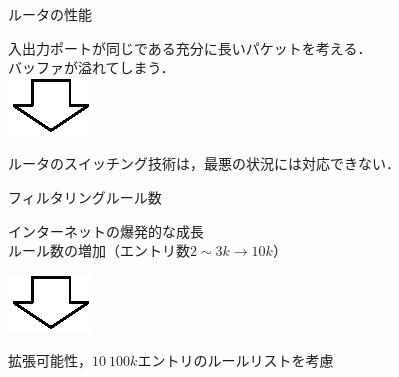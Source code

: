 \documentclass[12pt,dvipdfmx,mathserif,uplatex,aspectratio=32]{beamer}
\begin{document}
\begin{frame}{ルータの性能}

入出力ポートが同じである充分に長いパケットを考える．\\
\vspace{3mm}
 \hspace{1mm} バッファが溢れてしまう．\\

\vspace{5mm}
{\centering
\includegraphics{downarrow.eps} \\

}
\vspace{5mm}

{\centering
ルータのスイッチング技術は，最悪の状況には対応できない．

}

\end{frame}


\begin{frame}{フィルタリングルール数}

インターネットの爆発的な成長 \\ \vspace{3mm}  \hspace{1mm} ルール数の増加（エントリ数$2 \sim 3k \rightarrow 10k$）

\vspace{5mm}

{\centering
\includegraphics{downarrow.eps} \\

}

\vspace{5mm}

{\centering
拡張可能性，$10~100k$エントリのルールリストを考慮

}

\end{frame}
\end{document}
